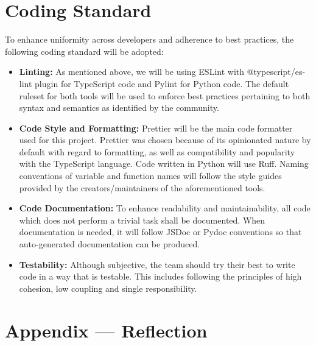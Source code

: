 \documentclass{article}
\begin{document}
\section{Coding Standard}

To enhance uniformity across developers and adherence to best practices, the following coding standard will
be adopted:
\begin{itemize}
  \item \textbf{Linting:} As mentioned above, we will be using ESLint with @typescript/es-lint plugin for TypeScript
  code and Pylint for Python code. The default ruleset for both tools will be used to enforce best
  practices pertaining to both syntax and semantics as identified by the community.\\
  \item \textbf{Code Style and Formatting:} Prettier will be the main code formatter used for this project. Prettier was
  chosen because of its opinionated nature by default with regard to formatting, as well as compatibility
  and popularity with the TypeScript language. Code written in Python will use Ruff. Naming conventions
  of variable and function names will follow the style guides provided by the creators/maintainers of the
  aforementioned tools.\\
  \item \textbf{Code Documentation:} To enhance readability and maintainability, all code which does not perform a
  trivial task shall be documented. When documentation is needed, it will follow JSDoc or Pydoc
  conventions so that auto-generated documentation can be produced.\\
  \item \textbf{Testability:} Although subjective, the team should try their best to write code in a way that is testable.
  This includes following the principles of high cohesion, low coupling and single responsibility.\\
\end{itemize}

\newpage{}

\section*{Appendix --- Reflection}
\end{document}
